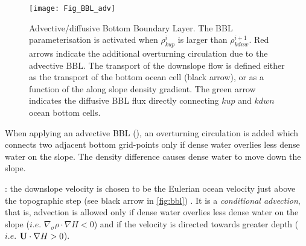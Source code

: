 \documentclass[../tex_main/NEMO_manual]{subfiles}
\begin{document}

\begin{figure}[!t]
  \begin{center}
    \texttt{[image: Fig\_BBL\_adv]}
    \caption{ 	\protect\label{fig:bbl}
      Advective/diffusive Bottom Boundary Layer.
      The BBL parameterisation is activated when $\rho^i_{kup}$ is larger than $\rho^{i+1}_{kdnw}$.
      Red arrows indicate the additional overturning circulation due to the advective BBL.
      The transport of the downslope flow is defined either as the transport of the bottom ocean cell (black arrow),
      or as a function of the along slope density gradient.
      The green arrow indicates the diffusive BBL flux directly connecting $kup$ and $kdwn$ ocean bottom cells.
    }
  \end{center}
\end{figure}




When applying an advective BBL (), an overturning circulation is added which
connects two adjacent bottom grid-points only if dense water overlies less dense water on the slope.
The density difference causes dense water to move down the slope. 

:
the downslope velocity is chosen to be the Eulerian ocean velocity just above the topographic step
(see black arrow in \autoref{fig:bbl}) \citep{Beckmann_Doscher1997}.
It is a \textit{conditional advection}, that is, advection is allowed only
if dense water overlies less dense water on the slope ($i.e.$ $\nabla_\sigma \rho  \cdot  \nabla H<0$) and
if the velocity is directed towards greater depth ($i.e.$ $\mathbf{U}  \cdot  \nabla H>0$).
\end{document}
